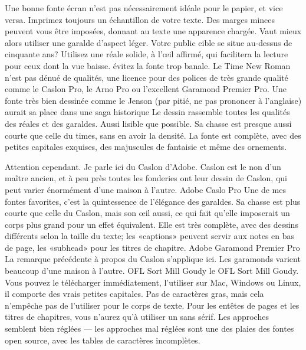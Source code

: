\documentclass[12pt,a4paper,twocolumn]{book} %
\begin{document}
Une bonne fonte écran n’est pas nécessairement idéale pour le papier, et vice versa. Imprimez toujours un échantillon de votre texte.
Des marges minces peuvent vous être imposées, donnant au texte une apparence chargée. Vaut mieux alors utiliser une garalde d’aspect léger. Votre public cible se situe au-dessus de cinquante ans? Utilisez une réale solide, à l’œil affirmé, qui facilitera la lecture pour ceux dont la vue baisse.
évitez la fonte trop banale. Le Time New Roman n’est pas dénué de qualités,
une licence pour des polices de très grande qualité comme le Caslon Pro,  le Arno Pro ou l’excellent Garamond Premier Pro.
Une fonte très bien dessinée comme le Jenson (par pitié, ne pas prononcer à l’anglaise) aurait sa place dans une saga historique
Le dessin rassemble toutes les qualités des réales et des garaldes. Aussi lisible que possible. Sa chasse est presque aussi courte que celle du times, sans en avoir la densité. La fonte est complète, avec des petites capitales exquises, des majuscules de fantaisie et même des ornements.

Attention cependant. Je parle ici du Caslon d’Adobe. Caslon est le non d’un maître ancien, et à peu près toutes les fonderies ont leur dessin de Caslon, qui peut varier énormément d’une maison à l’autre.
Adobe Caslo Pro
Une de mes fontes favorites, c’est la quintessence de l’élégance des garaldes. Sa chasse est plus courte que celle du Caslon, mais son œil aussi, ce qui fait qu’elle imposerait un corps plus grand pour un effet équivalent. Elle est très complète, avec des dessins différents selon la taille du texte; les «captions» peuvent servir aux notes en bas de page, les «subhead» pour les titres de chapitre.
Adobe Garamond Premier Pro
La remarque précédente à propos du Caslon s’applique ici. Les garamonds varient beaucoup d’une maison à l’autre.
OFL Sort Mill Goudy
le OFL Sort Mill Goudy. Vous pouvez le télécharger immédiatement, l’utiliser sur Mac, Windows ou Linux, il comporte des vrais petites capitales. Pas de caractères gras, mais cela n’empêche pas de l’utiliser pour le corps de texte. Pour les entêtes de pages et les titres de chapitres, vous n’aurez qu’à utiliser un sans sérif. Les approches semblent bien réglées — les approches mal réglées sont une des plaies des fontes open source, avec les tables de caractères incomplètes.
\end{document}
